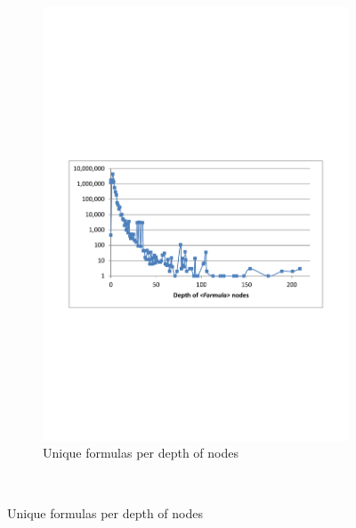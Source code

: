 \documentclass[times]{smrauth}
\begin{document}
\begin{figure}
\begin{subfigure}[b]{0.49\textwidth}
	\end{subfigure}
	~
	\begin{subfigure}[b]{0.49\textwidth}
		\centering
		\includegraphics[width=1\textwidth]{img/depths2}
		\caption{Unique formulas per depth of  nodes}
		\label{fig:depthFormula}
	\end{subfigure}
	~
	

\end{figure}
\end{document}
